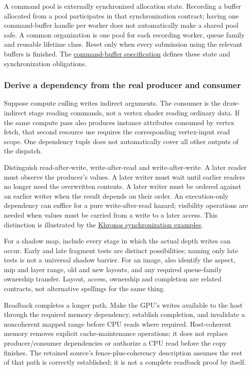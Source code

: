 A command pool is externally synchronized allocation state. Recording a buffer allocated from a pool participates in that synchronization contract; having one command-buffer handle per worker does not automatically make a shared pool safe. A common organization is one pool for each recording worker, queue family and reusable lifetime class. Reset only when every submission using the relevant buffers is finished. The \href{https://docs.vulkan.org/spec/latest/chapters/cmdbuffers.html}{command-buffer specification} defines these state and synchronization obligations.

\subsubsection{Derive a dependency from the real producer and consumer}\label{derive-a-dependency-from-the-real-producer-and-consumer}

Suppose compute culling writes indirect arguments. The consumer is the draw-indirect stage reading commands, not a vertex shader reading ordinary data. If the same compute pass also produces instance attributes consumed by vertex fetch, that second resource use requires the corresponding vertex-input read scope. One dependency tuple does not automatically cover all other outputs of the dispatch.

Distinguish read-after-write, write-after-read and write-after-write. A later reader must observe the producer's values. A later writer must wait until earlier readers no longer need the overwritten contents. A later writer must be ordered against an earlier writer when the result depends on their order. An execution-only dependency can suffice for a pure write-after-read hazard; visibility operations are needed when values must be carried from a write to a later access. This distinction is illustrated by the \href{https://docs.vulkan.org/guide/latest/synchronization_examples.html}{Khronos synchronization examples}.

For a shadow map, include every stage in which the actual depth writes can occur. Early and late fragment tests are distinct possibilities; naming only late tests is not a universal shadow barrier. For an image, also identify the aspect, mip and layer range, old and new layouts, and any required queue-family ownership transfer. Layout, access, ownership and completion are related contracts, not alternative spellings for the same thing.

Readback completes a longer path. Make the GPU's writes available to the host through the required memory dependency, establish completion, and invalidate a noncoherent mapped range before CPU reads where required. Host-coherent memory removes explicit cache-maintenance operations; it does not replace producer/consumer dependencies or authorize a CPU read before the copy finishes. The retained source's fence-plus-coherency description assumes the rest of that path is correctly established; it is not a complete readback proof by itself.

